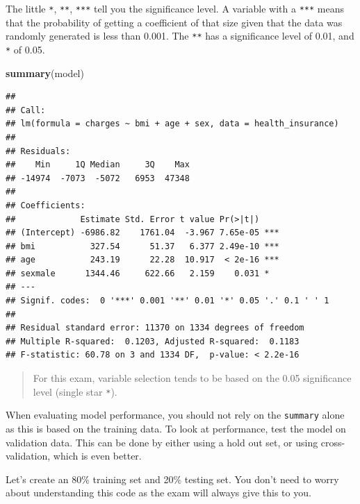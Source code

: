 \documentclass[
  openany]{book}
\newenvironment{Shaded}{\begin{snugshade}}{\end{snugshade}}
\newcommand{\CommentTok}[1]{\textcolor[rgb]{0.56,0.35,0.01}{\textit{#1}}}
\newcommand{\DataTypeTok}[1]{\textcolor[rgb]{0.13,0.29,0.53}{#1}}
\newcommand{\DecValTok}[1]{\textcolor[rgb]{0.00,0.00,0.81}{#1}}
\newcommand{\FloatTok}[1]{\textcolor[rgb]{0.00,0.00,0.81}{#1}}
\newcommand{\KeywordTok}[1]{\textcolor[rgb]{0.13,0.29,0.53}{\textbf{#1}}}
\newcommand{\NormalTok}[1]{#1}
\newcommand{\OperatorTok}[1]{\textcolor[rgb]{0.81,0.36,0.00}{\textbf{#1}}}
\newcommand{\StringTok}[1]{\textcolor[rgb]{0.31,0.60,0.02}{#1}}
\begin{document}
The little \texttt{*}, \texttt{**}, \texttt{***} tell you the significance level. A variable with a \texttt{***} means that the probability of getting a coefficient of that size given that the data was randomly generated is less than 0.001. The \texttt{**} has a significance level of 0.01, and \texttt{*} of 0.05.

\begin{Shaded}
\begin{Highlighting}[]
\KeywordTok{summary}\NormalTok{(model)}
\end{Highlighting}
\end{Shaded}

\begin{verbatim}
## 
## Call:
## lm(formula = charges ~ bmi + age + sex, data = health_insurance)
## 
## Residuals:
##    Min     1Q Median     3Q    Max 
## -14974  -7073  -5072   6953  47348 
## 
## Coefficients:
##             Estimate Std. Error t value Pr(>|t|)    
## (Intercept) -6986.82    1761.04  -3.967 7.65e-05 ***
## bmi           327.54      51.37   6.377 2.49e-10 ***
## age           243.19      22.28  10.917  < 2e-16 ***
## sexmale      1344.46     622.66   2.159    0.031 *  
## ---
## Signif. codes:  0 '***' 0.001 '**' 0.01 '*' 0.05 '.' 0.1 ' ' 1
## 
## Residual standard error: 11370 on 1334 degrees of freedom
## Multiple R-squared:  0.1203, Adjusted R-squared:  0.1183 
## F-statistic: 60.78 on 3 and 1334 DF,  p-value: < 2.2e-16
\end{verbatim}

\begin{quote}
For this exam, variable selection tends to be based on the 0.05 significance level (single star \texttt{*}).
\end{quote}

When evaluating model performance, you should not rely on the \texttt{summary} alone as this is based on the training data. To look at performance, test the model on validation data. This can be done by either using a hold out set, or using cross-validation, which is even better.

Let's create an 80\% training set and 20\% testing set. You don't need to worry about understanding this code as the exam will always give this to you.

\begin{Shaded}
\end{Shaded}
\end{document}
